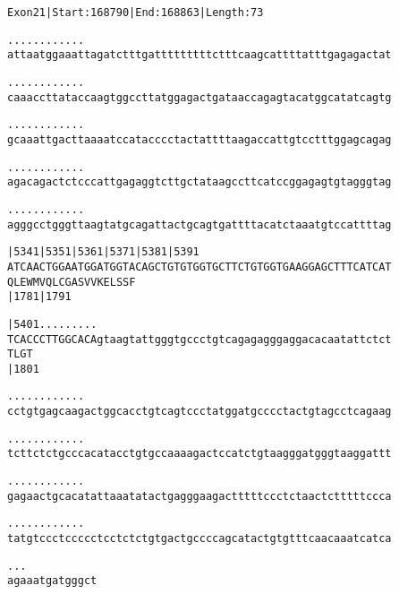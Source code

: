\documentclass{article}
\begin{document}
\begin{alltt}
Exon 21 | Start: 168790 | End: 168863 | Length: 73

.    .    .    .    .    .    .    .    .    .    .    .    
attaatggaaattagatctttgatttttttttctttcaagcattttatttgagagactat

.    .    .    .    .    .    .    .    .    .    .    .    
caaaccttataccaagtggccttatggagactgataaccagagtacatggcatatcagtg

.    .    .    .    .    .    .    .    .    .    .    .    
gcaaattgacttaaaatccatacccctactattttaagaccattgtcctttggagcagag

.    .    .    .    .    .    .    .    .    .    .    .    
agacagactctcccattgagaggtcttgctataagccttcatccggagagtgtagggtag

.    .    .    .    .    .    .    .    .    .    .    .    
agggcctgggttaagtatgcagattactgcagtgattttacatctaaatgtccattttag

        |5341     |5351     |5361     |5371     |5381     |5391
ATCAACTGGAATGGATGGTACAGCTGTGTGGTGCTTCTGTGGTGAAGGAGCTTTCATCAT
  Q  L  E  W  M  V  Q  L  C  G  A  S  V  V  K  E  L  S  S  F
        |1781                         |1791                 

        |5401     .    .    .    .    .    .    .    .    . 
TCACCCTTGGCACAgtaagtattgggtgccctgtcagagagggaggacacaatattctct
  T  L  G  T                                                
        |1801                                               

   .    .    .    .    .    .    .    .    .    .    .    . 
cctgtgagcaagactggcacctgtcagtccctatggatgcccctactgtagcctcagaag

   .    .    .    .    .    .    .    .    .    .    .    . 
tcttctctgcccacatacctgtgccaaaagactccatctgtaagggatgggtaaggattt

   .    .    .    .    .    .    .    .    .    .    .    . 
gagaactgcacatattaaatatactgagggaagactttttccctctaactctttttccca

   .    .    .    .    .    .    .    .    .    .    .    . 
tatgtccctccccctcctctctgtgactgccccagcatactgtgtttcaacaaatcatca

   .    .    .
agaaatgatgggct
\end{alltt}
\newpage
\end{document}
